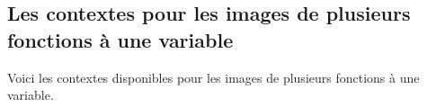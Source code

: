 \documentclass{tutodoc}
\begin{document}

\subsection{Les contextes pour les images de plusieurs fonctions à une variable}

Voici les contextes disponibles pour les images de plusieurs fonctions à une variable.

\medskip

\begin{itemize*}[before = \leavevmode\kern15pt, itemjoin = \kern15pt]
	\item {}

	\item {}
\end{itemize*}
\end{document}
